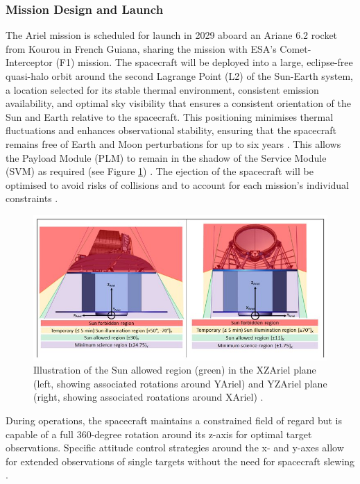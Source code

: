 \documentclass[12pt]{article}
\begin{document}
\subsubsection{Mission Design and Launch} \label{sec:2.1.2}

The Ariel mission is scheduled for launch in 2029 aboard an Ariane 6.2 rocket from Kourou in French Guiana, sharing the mission with ESA's Comet-Interceptor (F1) mission. The spacecraft will be deployed into a large, eclipse-free quasi-halo orbit around the second Lagrange Point (L2) of the Sun-Earth system, a location selected for its 
stable thermal environment, consistent emission availability, and optimal sky visibility that ensures a consistent orientation of the Sun and Earth relative to the spacecraft.
This positioning minimises thermal fluctuations and enhances observational stability, ensuring that the spacecraft remains free of Earth and Moon perturbations for up to six years \cite{salvignol2024ariel,arielstudyreport}.
This allows the Payload Module (PLM) to remain in the shadow of the Service Module (SVM) as required (see Figure \ref{fig:6}) \cite{salvignol2024ariel}.
The ejection of the spacecraft will be optimised to avoid risks of collisions and to account for each mission's individual constraints \cite{arielstudyreport}.

\begin{figure}[H]
    \centering
    \includegraphics[width=.9\textwidth]{sun no touch.jpg}
    \caption{Illustration of the Sun allowed region (green) in the XZAriel plane (left, showing associated rotations around YAriel) and YZAriel plane (right, showing associated roatations around XAriel) \protect\cite{salvignol2024ariel}.}
    \label{fig:6}
\end{figure}

During operations, the spacecraft maintains a constrained field of regard but is capable of a full 360-degree rotation around its z-axis for optimal target observations. Specific attitude control strategies around the x- and y-axes allow for extended observations of single targets without the need for spacecraft slewing \cite{salvignol2024ariel}.
\end{document}
